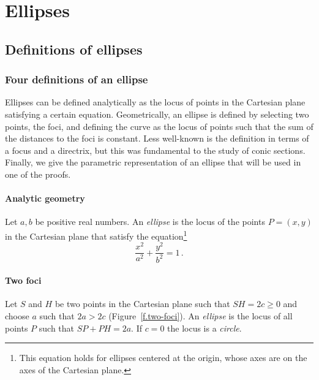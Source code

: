 
\part{Ellipses}



\chapter{Definitions of ellipses}\label{s.definitions}

\section{Four definitions of an ellipse}

Ellipses can be defined analytically as the locus of points in the Cartesian plane satisfying a certain equation. Geometrically, an ellipse is defined by selecting two points, the foci, and defining the curve as the locus of points such that the sum of the distances to the foci is constant. Less well-known is the definition in terms of a focus and a directrix, but this was fundamental to the study of conic sections. Finally, we give the parametric representation of an ellipse that will be used in one of the proofs.

\subsection*{Analytic geometry}

\begin{definition}\label{def.analytic}
Let $a,b$ be positive real numbers. An \emph{ellipse} is the locus of the points $P=(x,y)$ in the Cartesian plane that satisfy the equation\footnote{This equation holds for ellipses centered at the origin, whose axes are on the axes of the Cartesian plane.}
\begin{equation}
\frac{x^2}{a^2}+\frac{y^2}{b^2}=1\,.\label{eqn.ellipse-formula}
\end{equation}
\end{definition}


\subsection*{Two foci}
\begin{definition}\label{def.two-foci}
Let $S$ and $H$ be two points in the Cartesian plane such that $SH=2c\geq 0$ and choose $a$ such that $2a> 2c$ (Figure~\ref{f.two-foci}). An \emph{ellipse} is the locus of all points $P$ such that $SP+PH=2a$. If $c=0$ the locus is a \emph{circle}.
\end{definition}

